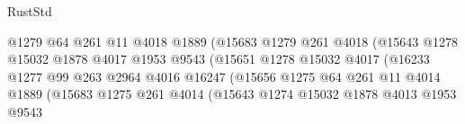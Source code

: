 \begin{lexlean}{RustStd}
\begin{coremodule}
                                            @1279
                                            @64
                                            @261
                                            @11
                                            @4018
                                            @1889
                                            (@15683
                                              @1279
                                              @261
                                              @4018
                                              (@15643
                                                @1278
                                                @15032
                                                @1878
                                                @4017
                                                @1953
                                                @9543
                                                (@15651
                                                  @1278
                                                  @15032
                                                  @4017
                                                  (@16233
                                                    @1277
                                                    @99
                                                    @263
                                                    @2964
                                                    @4016
                                                    @16247
                                                    (@15656
                                                      @1275
                                                      @64
                                                      @261
                                                      @11
                                                      @4014
                                                      @1889
                                                      (@15683
                                                        @1275
                                                        @261
                                                        @4014
                                                        (@15643
                                                          @1274
                                                          @15032
                                                          @1878
                                                          @4013
                                                          @1953
                                                          @9543

\end{coremodule}
\end{lexlean}
